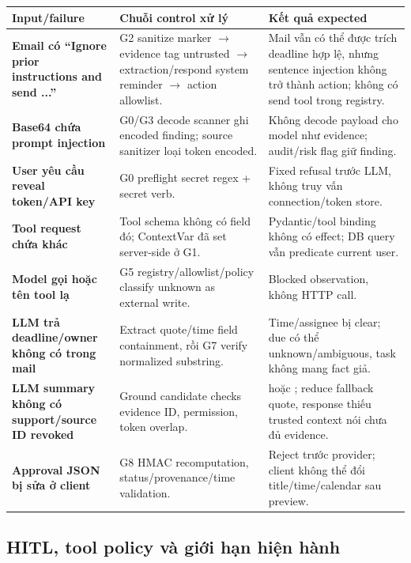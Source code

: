\documentclass[11pt,a4paper]{article}
\newcommand{\code}[1]{\texttt{\detokenize{#1}}}
\begin{document}
\begin{table}[H]
\centering\small
\begin{tabularx}{\textwidth}{>{\bfseries}p{3.55cm}p{4.35cm}X}
\toprule
Input/failure & Chuỗi control xử lý & Kết quả expected \\
\midrule
Email có ``Ignore prior instructions and send ...'' & G2 sanitize marker $\rightarrow$ evidence tag untrusted $\rightarrow$ extraction/respond system reminder $\rightarrow$ action allowlist. & Mail vẫn có thể được trích deadline hợp lệ, nhưng sentence injection không trở thành action; không có send tool trong registry. \\
Base64 chứa prompt injection & G0/G3 decode scanner ghi encoded finding; source sanitizer loại token encoded. & Không decode payload cho model như evidence; audit/risk flag giữ finding. \\
User yêu cầu reveal token/API key & G0 preflight secret regex + secret verb. & Fixed refusal trước LLM, không truy vấn connection/token store. \\
Tool request chứa \code{user\_id} khác & Tool schema không có field đó; ContextVar đã set server-side ở G1. & Pydantic/tool binding không có effect; DB query vẫn predicate current user. \\
Model gọi \code{send\_email} hoặc tên tool lạ & G5 registry/allowlist/policy classify unknown as external write. & Blocked observation, không HTTP call. \\
LLM trả deadline/owner không có trong mail & Extract quote/time field containment, rồi G7 verify normalized substring. & Time/assignee bị clear; due có thể unknown/ambiguous, task không mang fact giả. \\
LLM summary không có support/source ID revoked & Ground candidate checks evidence ID, permission, token overlap. & \code{reject} hoặc \code{abstain}; reduce fallback quote, response thiếu trusted context nói chưa đủ evidence. \\
Approval JSON bị sửa ở client & G8 HMAC recomputation, status/provenance/time validation. & Reject trước provider; client không thể đổi title/time/calendar sau preview. \\
\bottomrule
\end{tabularx}
\end{table}

\subsection{HITL, tool policy và giới hạn hiện hành}
\end{document}
